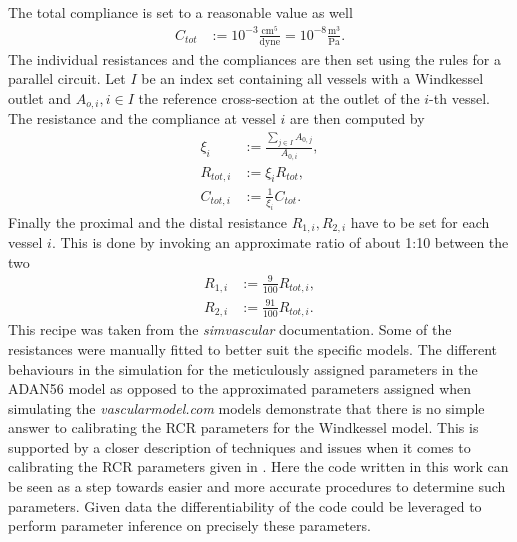 \documentclass[a4paper, oneside]{discothesis}
\begin{document}
The total compliance is set to a reasonable value as well
\begin{align}
	C_{tot} &:= 10^{-3} \frac{\text{cm}^5}{\text{dyne}} = 10^{-8} \frac{\text{m}^3}{\text{Pa}}.
\end{align}
The individual resistances and the compliances are then set using the rules for a parallel circuit.
Let $I$ be an index set containing all vessels with a Windkessel outlet and $A_{o,i}, i \in I$ the reference cross-section at the outlet of the $i$-th vessel.
The resistance and the compliance at vessel $i$ are then computed by
\begin{align}
	\xi_i &:= \frac{\sum_{j \in I} A_{0,j}}{A_{0,i}}, \\
	R_{tot,i} &:= \xi_i R_{tot}, \\
	C_{tot,i} &:= \frac{1}{\xi_i} C_{tot}. 
\end{align}
Finally the proximal and the distal resistance $R_{1,i}, R_{2,i}$ have to be set for each vessel $i$.
This is done by invoking an approximate ratio of about 1:10 between the two
\begin{align}
	R_{1,i} &:= \frac{9}{100} R_{tot,i}, \\
	R_{2,i} &:= \frac{91}{100} R_{tot,i}.
\end{align}
This recipe was taken from the \emph{simvascular} documentation. \cite{simvascular}
Some of the resistances were manually fitted to better suit the specific models.
The different behaviours in the simulation for the meticulously assigned parameters in the ADAN56 model as opposed to the approximated parameters assigned when simulating the \emph{vascularmodel.com} models demonstrate that there is no simple answer to calibrating the RCR parameters for the Windkessel model.
This is supported by a closer description of techniques and issues when it comes to calibrating the RCR parameters given in \cite{köppl2023dimension}.
Here the code written in this work can be seen as a step towards easier and more accurate procedures to determine such parameters.
Given data the differentiability of the code could be leveraged to perform parameter inference on precisely these parameters.
\end{document}
